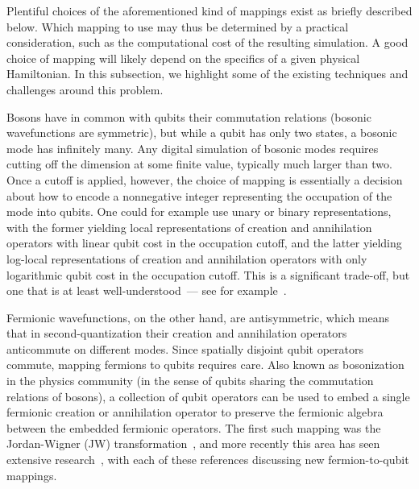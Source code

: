Plentiful choices of the aforementioned kind of mappings exist as briefly described below.  
Which mapping to use may thus be determined by a practical consideration, such as the computational cost of the resulting simulation.
A good choice of mapping will likely depend on the specifics of a given physical Hamiltonian.
In this subsection, we highlight some of the existing techniques and challenges around this problem.


Bosons have in common with qubits their commutation relations (bosonic wavefunctions are symmetric), but while a qubit has only two states, a bosonic mode has infinitely many.
Any digital simulation of bosonic modes requires cutting off the dimension at some finite value, typically much larger than two.
Once a cutoff is applied, however, the choice of mapping is essentially a decision about how to encode a nonnegative integer representing the occupation of the mode into qubits.
One could for example use unary or binary representations, with the former yielding local representations of creation and annihilation operators with linear qubit cost in the occupation cutoff, and the latter yielding log-local representations of creation and annihilation operators with only logarithmic qubit cost in the occupation cutoff.
This is a significant trade-off, but one that is at least well-understood~--- see for example~\cite{somma2005quantum,macridin2018electronphonon,mcardle2019digital,sawaya2019quantum,kan2021lattice,kreshchuk2022quantum,kan2022simulating}.

Fermionic wavefunctions, on the other hand, are antisymmetric, which means that in second-quantization their creation and annihilation operators anticommute on different modes.
Since spatially disjoint qubit operators commute, mapping fermions to qubits requires care.
Also known as bosonization in the physics community (in the sense of qubits sharing the commutation relations of bosons), a collection of qubit operators can be used to embed a single fermionic creation or annihilation operator to preserve the fermionic algebra between the embedded fermionic operators.
The first such mapping was the Jordan-Wigner (JW) transformation~\cite{jordanwigner1928}, and more recently this area has seen extensive research~\cite{bravyi2002fermionic,verstraete2005mapping,seeley2012bravyikitaev,bravyi2017tapering,setia2018bksf,steudtner2018fermions,steudtner2019fermions,wang2021resource,derby2021compact,derby2021alternative,kirby2022fermiontoqubit,chien2022optimizing,wang2023ever}, with each of these references discussing new fermion-to-qubit mappings.

